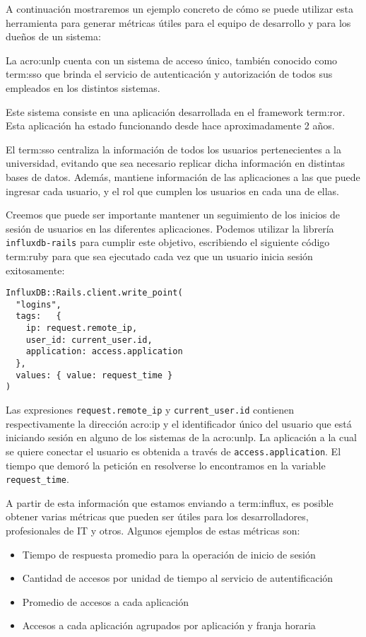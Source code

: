 A continuación mostraremos un ejemplo concreto de cómo se puede utilizar esta
herramienta para generar métricas útiles para el equipo de desarrollo y para
los dueños de un sistema:

La \gls{acro:unlp} cuenta con un sistema de acceso único, también conocido como
\gls{term:sso} que brinda el servicio de autenticación y autorización de todos
sus empleados en los distintos sistemas.

Este sistema consiste en una aplicación desarrollada en el framework
\gls{term:ror}. Esta aplicación ha estado funcionando desde hace
aproximadamente 2 años.

El \gls{term:sso} centraliza la información de todos los usuarios
pertenecientes a la universidad, evitando que sea necesario replicar dicha
información en distintas bases de datos. Además, mantiene información de las
aplicaciones a las que puede ingresar cada usuario, y el rol que cumplen los
usuarios en cada una de ellas.

Creemos que puede ser importante mantener un seguimiento de los inicios de
sesión de usuarios en las diferentes aplicaciones. Podemos utilizar la librería
\texttt{influxdb-rails} para cumplir este objetivo, escribiendo el siguiente
código \gls{term:ruby} para que sea ejecutado cada vez que un usuario inicia
sesión exitosamente:

\begin{lstlisting}
InfluxDB::Rails.client.write_point(
  "logins",
  tags:   { 
    ip: request.remote_ip,
    user_id: current_user.id,
    application: access.application
  },
  values: { value: request_time }
)
\end{lstlisting}

Las expresiones \lstinline{request.remote_ip} y \lstinline{current_user.id}
contienen respectivamente la dirección \gls{acro:ip} y el identificador único
del usuario que está iniciando sesión en alguno de los sistemas de la
\gls{acro:unlp}. La aplicación a la cual se quiere conectar el usuario es
obtenida a través de \lstinline{access.application}. El tiempo que demoró la
petición  en resolverse lo encontramos en la variable
\lstinline{request_time}.

A partir de esta información que estamos enviando a \gls{term:influx}, es
posible obtener varias métricas que pueden ser útiles para los desarrolladores,
profesionales de IT y otros. Algunos ejemplos de estas métricas son:

\begin{itemize}
  \item Tiempo de respuesta promedio para la operación de inicio de sesión
  \item Cantidad de accesos por unidad de tiempo al servicio de autentificación
  \item Promedio de accesos a cada aplicación
  \item Accesos a cada aplicación agrupados por aplicación y franja horaria
\end{itemize}

